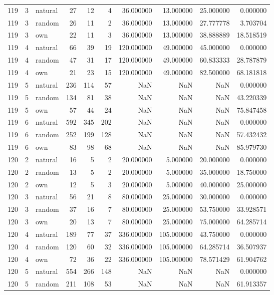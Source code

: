 \begin{table}[htbp]
\begin{tabular}{rrlrrrrrrr}
119 & 3 & natural & 27 & 12 & 4 & 36.000000 & 13.000000 & 25.000000 & 0.000000 \\
119 & 3 & random & 26 & 11 & 2 & 36.000000 & 13.000000 & 27.777778 & 3.703704 \\
119 & 3 & own & 22 & 11 & 3 & 36.000000 & 13.000000 & 38.888889 & 18.518519 \\
119 & 4 & natural & 66 & 39 & 19 & 120.000000 & 49.000000 & 45.000000 & 0.000000 \\
119 & 4 & random & 47 & 31 & 17 & 120.000000 & 49.000000 & 60.833333 & 28.787879 \\
119 & 4 & own & 21 & 23 & 15 & 120.000000 & 49.000000 & 82.500000 & 68.181818 \\
119 & 5 & natural & 236 & 114 & 57 & NaN & NaN & NaN & 0.000000 \\
119 & 5 & random & 134 & 81 & 38 & NaN & NaN & NaN & 43.220339 \\
119 & 5 & own & 57 & 44 & 24 & NaN & NaN & NaN & 75.847458 \\
119 & 6 & natural & 592 & 345 & 202 & NaN & NaN & NaN & 0.000000 \\
119 & 6 & random & 252 & 199 & 128 & NaN & NaN & NaN & 57.432432 \\
119 & 6 & own & 83 & 98 & 68 & NaN & NaN & NaN & 85.979730 \\
120 & 2 & natural & 16 & 5 & 2 & 20.000000 & 5.000000 & 20.000000 & 0.000000 \\
120 & 2 & random & 13 & 5 & 2 & 20.000000 & 5.000000 & 35.000000 & 18.750000 \\
120 & 2 & own & 12 & 5 & 3 & 20.000000 & 5.000000 & 40.000000 & 25.000000 \\
120 & 3 & natural & 56 & 21 & 8 & 80.000000 & 25.000000 & 30.000000 & 0.000000 \\
120 & 3 & random & 37 & 16 & 7 & 80.000000 & 25.000000 & 53.750000 & 33.928571 \\
120 & 3 & own & 20 & 13 & 7 & 80.000000 & 25.000000 & 75.000000 & 64.285714 \\
120 & 4 & natural & 189 & 77 & 37 & 336.000000 & 105.000000 & 43.750000 & 0.000000 \\
120 & 4 & random & 120 & 60 & 32 & 336.000000 & 105.000000 & 64.285714 & 36.507937 \\
120 & 4 & own & 72 & 36 & 22 & 336.000000 & 105.000000 & 78.571429 & 61.904762 \\
120 & 5 & natural & 554 & 266 & 148 & NaN & NaN & NaN & 0.000000 \\
120 & 5 & random & 211 & 108 & 53 & NaN & NaN & NaN & 61.913357 \\

\end{tabular}
\end{table}
